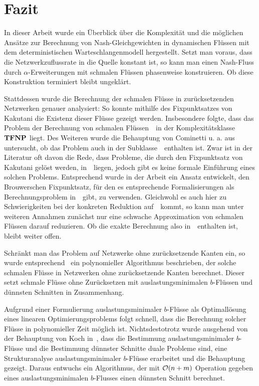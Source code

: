 \newenvironment{absolutelynopagebreak}
{\par\nobreak\vfil\penalty0\vfilneg
	\vtop\bgroup}
{\par\xdef\tpd{\the\prevdepth}\egroup
	\prevdepth=\tpd}

\chapter{Fazit}

In dieser Arbeit wurde ein Überblick über die Komplexität und die möglichen Ansätze zur Berechnung von Nash-Gleichgewichten in dynamischen Flüssen mit dem deterministischen Warteschlangenmodell hergestellt.
Setzt man voraus, dass die Netzwerkzuflussrate in die Quelle konstant ist, so kann man einen Nash-Fluss durch $\alpha$-Erweiterungen mit schmalen Flüssen phasenweise konstruieren.
Ob diese Konstruktion terminiert bleibt ungeklärt.

Stattdessen wurde die Berechnung der schmalen Flüsse in zurücksetzenden Netzwerken genauer analysiert:
So konnte mithilfe des Fixpunktsatzes von Kakutani die Existenz dieser Flüsse gezeigt werden.
Insbesondere folgte, dass das Problem der Berechnung von schmalen Flüssen~\probTFwR\ in der Komplexitätsklasse~$\mathbf{TFNP}$ liegt.
Des Weiteren wurde die Behauptung von Cominetti u. a. aus~\cite{Cominetti2015} untersucht, ob das Problem auch in der Subklasse~\PPAD\ enthalten ist.
Zwar ist in der Literatur oft davon die Rede, dass Probleme, die durch den Fixpunktsatz von Kakutani gelöst werden, in~\PPAD\ liegen, jedoch gibt es keine formale Einführung eines solchen Problems.
Entsprechend wurde in der Arbeit ein Ansatz entwickelt, den Brouwerschen Fixpunktsatz, für den es entsprechende Formalisierungen als Berechnungsproblem in~\PPAD\ gibt, zu verwenden.
Gleichwohl es auch hier zu Schwierigkeiten bei der konkreten Reduktion auf~\Brouwer\ kommt, so kann man unter weiteren Annahmen zunächst nur eine schwache Approximation von schmalen Flüssen darauf reduzieren.
Ob die exakte Berechnung also in~\PPAD\ enthalten ist, bleibt weiter offen.

Schränkt man das Problem auf Netzwerke ohne zurücksetzende Kanten ein, so wurde entsprechend~\cite{Koch2012} ein polynomieller Algorithmus beschrieben, der solche schmalen Flüsse in Netzwerken ohne zurücksetzende Kanten berechnet.
Dieser setzt schmale Flüsse ohne Zurücksetzen mit auslastungsminimalen $b$-Flüssen und dünnsten Schnitten in Zusammenhang.

Aufgrund einer Formulierung auslastungsminimaler $b$-Flüsse als Optimallösung eines linearen Optimierungsproblems folgt schnell, dass die Berechnung solcher Flüsse in polynomieller Zeit möglich ist.
Nichtsdestotrotz wurde ausgehend von der Behauptung von Koch in~\cite{Koch2012}, dass die Bestimmung auslastungsminimaler $b$-Flüsse und die Bestimmung dünnster Schnitte duale Probleme sind, eine Strukturanalyse auslastungsminimaler $b$-Flüsse erarbeitet und die Behauptung gezeigt.
Daraus entwuchs ein Algorithmus, der mit $\mathcal{O}(n+m)$ Operation gegeben eines auslastungsminimalen $b$-Flusses einen dünnsten Schnitt berechnet.

